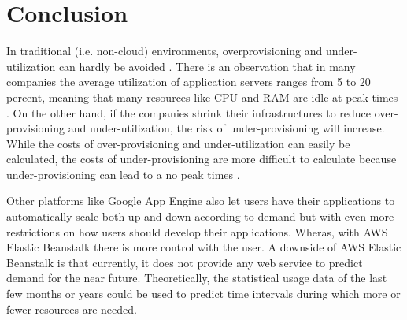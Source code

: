 \documentclass[9pt,twocolumn,twoside]{../../styles/osajnl}
\begin{document}
\section{Conclusion}

In traditional (i.e. non-cloud) environments, overprovisioning and
under-utilization can hardly be avoided \cite{cloudcomuting}. There is
an observation that in many companies the average utilization of
application servers ranges from 5 to 20 percent, meaning that many
resources like CPU and RAM are idle at peak times
\cite{cloudcomputing-2}.  On the other hand, if the companies shrink
their infrastructures to reduce over-provisioning and
under-utilization, the risk of under-provisioning will increase. While
the costs of over-provisioning and under-utilization can easily be
calculated, the costs of under-provisioning are more difficult to
calculate because under-provisioning can lead to a no peak times
\cite{cloudcomputing-2}.

Other platforms like Google App Engine \cite{google-appengine} also
let users have their applications to automatically scale both up and
down according to demand but with even more restrictions on how users
should develop their applications. Wheras, with AWS Elastic Beanstalk
there is more control with the user. A downside of AWS Elastic
Beanstalk is that currently, it does not provide any web service to
predict demand for the near future. Theoretically, the statistical
usage data of the last few months or years could be used to predict
time intervals during which more or fewer resources are needed.



 
\end{document}
